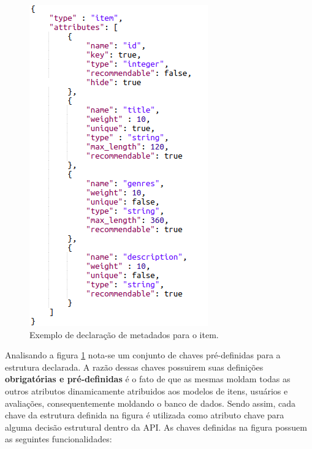 \documentclass[12pt, openright, oneside, a4paper, brazil]{abntex2}
\begin{document}
\begin{figure}[htp]

	\caption{\label{metadata}Exemplo de declaração de metadados para o item.}

	\begin{center}
		\includegraphics[scale=0.8]{images/metadata.png}
	\end{center}

	\hspace{5.5cm}{Fonte: O Autor.}

\end{figure}

Analisando a figura \ref{metadata} nota-se um conjunto de chaves pré-definidas para a estrutura declarada. A razão dessas chaves possuirem suas definições \textbf{obrigatórias e pré-definidas} é o fato de que as mesmas moldam todas as outros atributos dinamicamente atribuidos aos modelos de itens, usuários e avaliações, consequentemente moldando o banco de dados. Sendo assim, cada chave da estrutura definida na figura é utilizada como atributo chave para alguma decisão estrutural dentro da API. As chaves definidas na figura possuem as seguintes funcionalidades:
\end{document}
